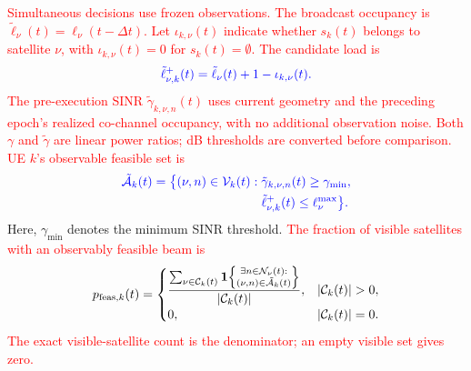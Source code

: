 \documentclass[10pt,letterpaper,journal]{IEEEtran}
\newcommand{\revnew}[1]{\textcolor{red}{#1}}
\begin{document}
\revnew{Simultaneous decisions use frozen observations.}
\revnew{The broadcast occupancy is $\tilde{\ell}_\nu(t)=\ell_\nu(t-\Delta t)$. Let $\iota_{k,\nu}(t)$ indicate whether $s_k(t)$ belongs to satellite $\nu$, with $\iota_{k,\nu}(t)=0$ for $s_k(t)=\emptyset$. The candidate load is}
\begin{equation}
\textcolor{blue}{
\tilde{\ell}_{\nu,k}^{+}(t)
=
\tilde{\ell}_\nu(t)+1-\iota_{k,\nu}(t).}    
\end{equation}
\revnew{The pre-execution SINR $\tilde{\gamma}_{k,\nu,n}(t)$ uses current geometry and the preceding epoch's realized co-channel occupancy, with no additional observation noise. Both $\gamma$ and $\tilde\gamma$ are linear power ratios; dB thresholds are converted before comparison. UE $k$'s observable feasible set is}
\begin{equation}
\textcolor{blue}{
\begin{aligned}
\tilde{\mathcal A}_k(t)=\bigl\{(\nu,n)\in\mathcal V_k(t):\;&
\tilde\gamma_{k,\nu,n}(t)\ge\gamma_{\min},\\
&\tilde\ell_{\nu,k}^{+}(t)\le\ell_\nu^{\max}\bigr\}.
\end{aligned}
}
\label{eq:observable_feasible_set}
\end{equation}
Here, $\gamma_{\min}$ denotes the minimum SINR threshold.
\revnew{The fraction of visible satellites with an observably feasible beam is}
\begin{equation}
p_{{\rm feas},k}(t)=
\begin{cases}
\displaystyle
\frac{\sum_{\nu\in\mathcal C_k(t)}
\mathbf 1\!\left\{\substack{\exists n\in\mathcal N_\nu(t):\\
(\nu,n)\in\tilde{\mathcal A}_k(t)}\right\}}
{|\mathcal C_k(t)|},
& |\mathcal C_k(t)|>0,\\[4pt]
0,& |\mathcal C_k(t)|=0.
\end{cases}
\label{eq:p_feas}
\end{equation}
\revnew{The exact visible-satellite count is the denominator; an empty visible set gives zero.}
\end{document}
